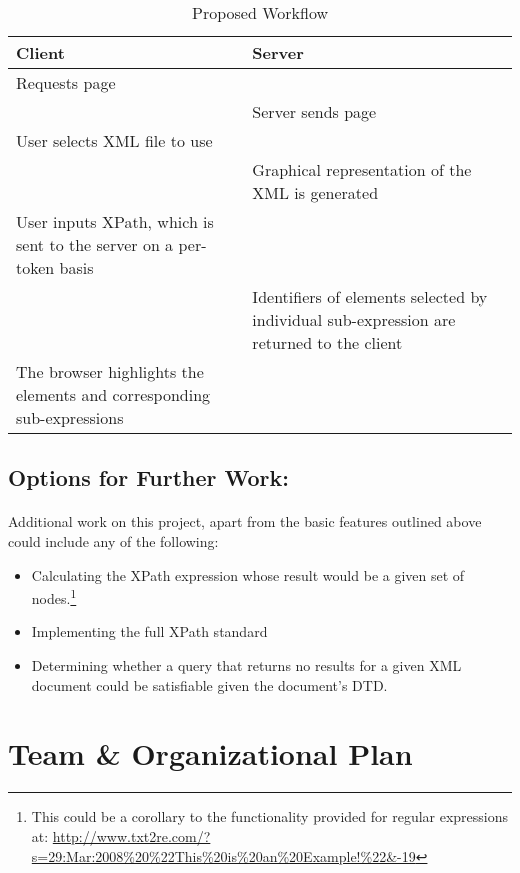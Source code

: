 \documentclass[12pt,letterpaper,final]{article}
\begin{document}
\begin{table}[!htpb]
\caption{Proposed Workflow}
\label{browser-interaction}
\centering
\begin{tabular*}{\textwidth}{p{} | p{}}
\textbf{Client}					&	\textbf{Server}\\
\hline
\hline
Requests page					&	\\
\hline
								&	Server sends page\\
\hline
User selects XML file to use	&	\\
\hline
								&	Graphical representation of the XML is generated \\
\hline
User inputs XPath, which is sent to the server on a per-token basis & \\
\hline
								& Identifiers of elements selected by individual
 sub-expression are returned to the client \\
\hline The browser highlights the elements and corresponding sub-expressions & \\
\end{tabular*}
\end{table}









\subsection{Options for Further Work:}
\paragraph{}
Additional work on this project, apart from the basic features outlined above could include any of the following:
\begin{itemize}
\item Calculating the XPath expression whose result would be a given set of nodes.\protect\footnote{This could be a corollary to the functionality provided for regular expressions at: \url{http://www.txt2re.com/?s=29:Mar:2008\%20\%22This\%20is\%20an\%20Example!\%22&-19}}
\item Implementing the full XPath standard
\item Determining whether a query that returns no results for a given XML document could be satisfiable given the document's DTD.
\end{itemize}

\section{Team \& Organizational Plan}
\end{document}
